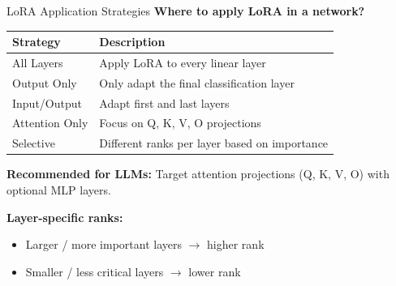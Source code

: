\documentclass[aspectratio=169,10pt]{beamer}
\begin{document}
\begin{frame}{LoRA Application Strategies}
	\textbf{Where to apply LoRA in a network?}

	\vspace{0.3cm}
	\begin{table}
		\centering
		\small
		\begin{tabular}{lp{6cm}}
			\toprule
			\textbf{Strategy} & \textbf{Description}                          \\
			\midrule
			All Layers        & Apply LoRA to every linear layer              \\
			Output Only       & Only adapt the final classification layer     \\
			Input/Output      & Adapt first and last layers                   \\
			Attention Only    & Focus on Q, K, V, O projections               \\
			Selective         & Different ranks per layer based on importance \\
			\bottomrule
		\end{tabular}
	\end{table}

	\vspace{0.3cm}
	\textbf{Recommended for LLMs:} Target attention projections (Q, K, V, O) with optional MLP layers.

	\vspace{0.3cm}
	\textbf{Layer-specific ranks:}
	\begin{itemize}
		\item Larger / more important layers $\to$ higher rank
		\item Smaller / less critical layers $\to$ lower rank
	\end{itemize}
\end{frame}
\end{document}
